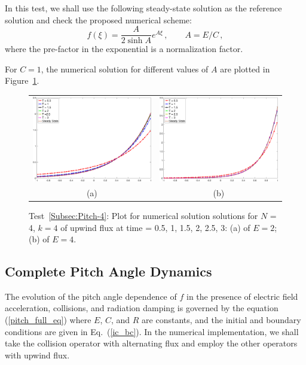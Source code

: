 \documentclass[preprint,11pt]{elsarticle}
\newcommand{\bq}{\begin{equation}}
\newcommand{\eq}{\end{equation}}
\begin{document}
 In this test, we shall use the following steady-state solution as the reference solution and check the proposed numerical scheme:
\bq
\label{pitch_E_coll_sol}
f(\xi)=\frac{A}{2 \sinh A} e^{A \xi}\, , \qquad A=E/C \, ,
\eq
where the pre-factor in the exponential is a normalization factor. 

For $C = 1$, the numerical solution for different values of $A$ are plotted in Figure~\ref{fig:pitch_E_coll}.

\begin{figure}[H]
\centering
\begin{tabular}{cc}
  \includegraphics[width=.45\textwidth]{./NumFig/condiff-uf-E2_v2}
  &\includegraphics[width=.45\textwidth]{./NumFig/condiff-uf-E4_v2}\\
  (a) & (b)
  \end{tabular}
\caption{Test~\ref{Subsec:Pitch-4}: Plot for numerical solution solutions for $N$ = 4, $k = 4$ of upwind flux at time = 0.5, 1, 1.5, 2, 2.5, 3: (a) of $E=2$; (b) of $E = 4$.}\label{fig:pitch_E_coll}
\end{figure}


\subsection{Complete Pitch Angle Dynamics}
\label{Subsec:Pitch-5}
The evolution of the pitch angle dependence of $f$ in the presence of electric field acceleration, collisions, and radiation damping is governed by the equation (\ref{pitch_full_eq})
where $E$, $C$, and $R$ are constants, and the initial and boundary conditions are given in Eq.~(\ref{ic_bc}). In the numerical implementation, we shall take the collision operator with alternating flux and employ the other operators with upwind flux.
\end{document}
